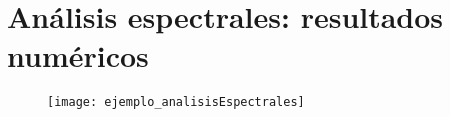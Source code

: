 \chapter{Análisis espectrales: resultados numéricos}

\begin{figure}[H]
	\centering
	\texttt{[image: ejemplo\_analisisEspectrales]} 
\end{figure}	
